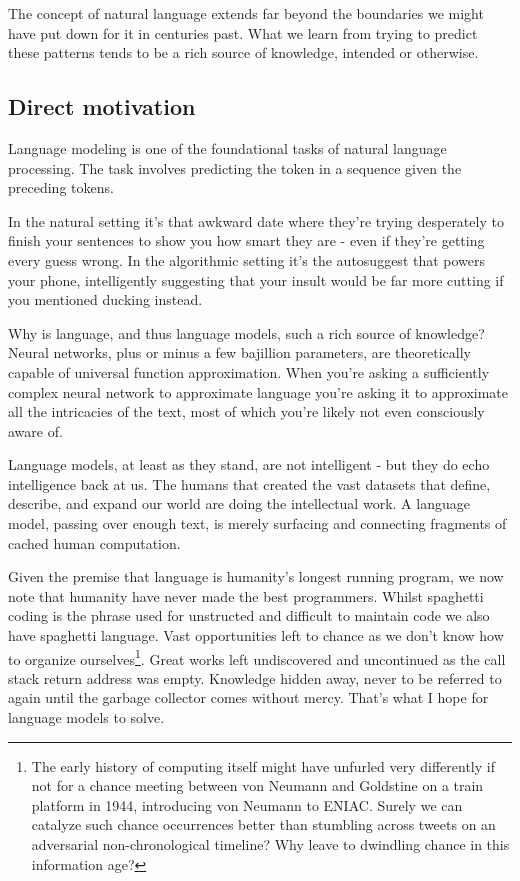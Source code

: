 \documentclass{article}
\begin{document}
The concept of natural language extends far beyond the boundaries we might have put down for it in centuries past.
What we learn from trying to predict these patterns tends to be a rich source of knowledge, intended or otherwise.

\subsection{Direct motivation}

Language modeling is one of the foundational tasks of natural language processing.
The task involves predicting the  token in a sequence given the  preceding tokens.

In the natural setting it's that awkward date where they're trying desperately to finish your sentences to show you how smart they are - even if they're getting every guess wrong.
In the algorithmic setting it's the autosuggest that powers your phone, intelligently suggesting that your insult would be far more cutting if you mentioned ducking instead.



Why is language, and thus language models, such a rich source of knowledge?
Neural networks, plus or minus a few bajillion parameters, are theoretically capable of universal function approximation.
When you're asking a sufficiently complex neural network to approximate language you're asking it to approximate all the intricacies of the text, most of which you're likely not even consciously aware of.

Language models, at least as they stand, are not intelligent - but they do echo intelligence back at us.
The humans that created the vast datasets that define, describe, and expand our world are doing the intellectual work.
A language model, passing over enough text, is merely surfacing and connecting fragments of cached human computation.

Given the premise that language is humanity's longest running program, we now note that humanity have never made the best programmers.
Whilst spaghetti coding is the phrase used for unstructed and difficult to maintain code we also have spaghetti language.
Vast opportunities left to chance as we don't know how to organize ourselves\footnote{The early history of computing itself might have unfurled very differently if not for a chance meeting between von Neumann and Goldstine on a train platform in 1944, introducing von Neumann to ENIAC. Surely we can catalyze such chance occurrences better than stumbling across tweets on an adversarial non-chronological timeline? Why leave to dwindling chance in this information age?}.
Great works left undiscovered and uncontinued as the call stack return address was empty.
Knowledge hidden away, never to be referred to again until the garbage collector comes without mercy.
That's what I hope for language models to solve.
\end{document}
